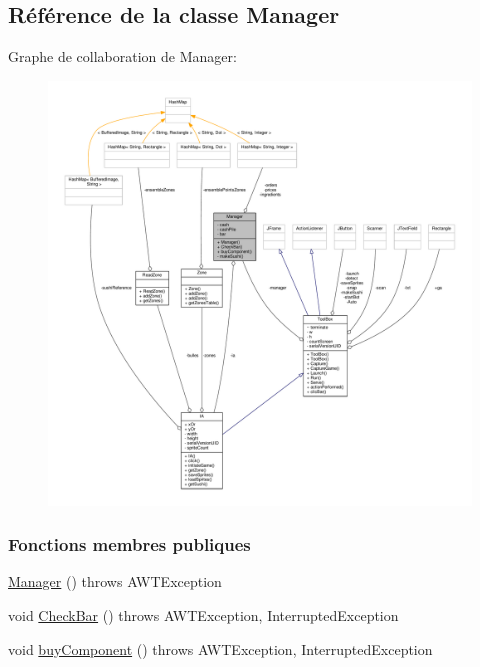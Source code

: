 \hypertarget{classManager}{}\subsection{Référence de la classe Manager}
\label{classManager}


Graphe de collaboration de Manager\+:\nopagebreak
\begin{figure}[H]
\begin{center}
\leavevmode
\includegraphics[width=350pt]{classManager__coll__graph}
\end{center}
\end{figure}
\subsubsection*{Fonctions membres publiques}
\begin{DoxyCompactItemize}
\item 
\hyperlink{classManager_ac6127238598371b4f44d1eed3b0c3b51}{Manager} ()  throws A\+W\+T\+Exception 
\item 
void \hyperlink{classManager_af4eb183d5dac5e9de89de6af2539cff7}{Check\+Bar} ()  throws A\+W\+T\+Exception, Interrupted\+Exception 
\item 
void \hyperlink{classManager_a724cfc01202d03838058a525454a1936}{buy\+Component} ()  throws A\+W\+T\+Exception, Interrupted\+Exception
\end{DoxyCompactItemize}
